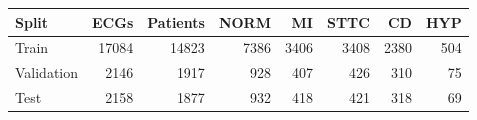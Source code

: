 \begin{tabular}{lrrrrrrr}
\toprule
Split & ECGs & Patients & NORM & MI & STTC & CD & HYP \\
\midrule
Train & 17084 & 14823 & 7386 & 3406 & 3408 & 2380 & 504 \\
Validation & 2146 & 1917 & 928 & 407 & 426 & 310 & 75 \\
Test & 2158 & 1877 & 932 & 418 & 421 & 318 & 69 \\
\bottomrule
\end{tabular}
